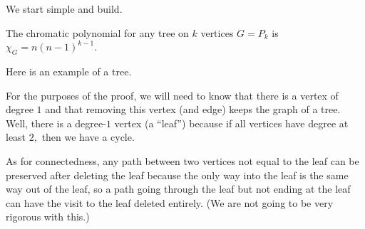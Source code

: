 We start simple and build.
\begin{proposition}
    The chromatic polynomial for any tree on $k$ vertices $G=P_k$ is $\chi_G=n(n-1)^{k-1}.$
\end{proposition}
Here is an example of a tree.
\begin{center}
\end{center}
For the purposes of the proof, we will need to know that there is a vertex of degree $1$ and that removing this vertex (and edge) keeps the graph of a tree. Well, there is a degree-$1$ vertex (a ``leaf'') because if all vertices have degree at least $2,$ then we have a cycle.

As for connectedness, any path between two vertices not equal to the leaf can be preserved after deleting the leaf because the only way into the leaf is the same way out of the leaf, so a path going through the leaf but not ending at the leaf can have the visit to the leaf deleted entirely. (We are not going to be very rigorous with this.)

